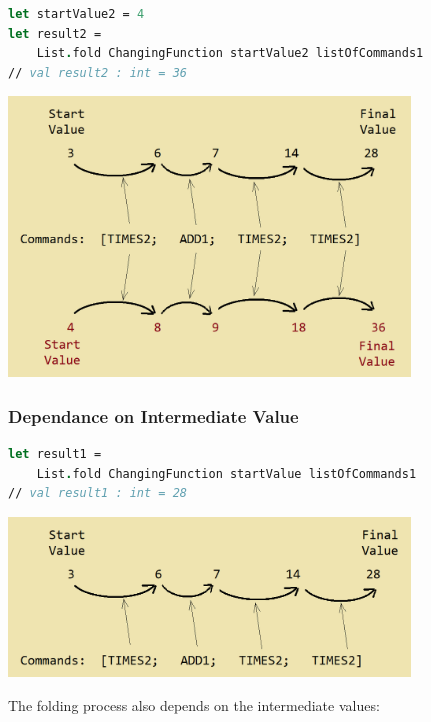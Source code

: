 \documentclass[12pt]{article}
\begin{document}
\begin{lstlisting}[language=FSharp]
let startValue2 = 4
let result2 =
    List.fold ChangingFunction startValue2 listOfCommands1
// val result2 : int = 36
\end{lstlisting}
\begin{center}
\includegraphics[width=0.8\textwidth]{pictures/picture32.png}
\end{center}

\vfill

\pagebreak

\subsubsection*{Dependance on Intermediate Value}

\begin{lstlisting}[language=FSharp]
let result1 =
    List.fold ChangingFunction startValue listOfCommands1
// val result1 : int = 28
\end{lstlisting}
\begin{center}
\includegraphics[width=0.8\textwidth]{pictures/picture31.png}
\end{center}
The folding process also depends on the intermediate values:
\end{document}
